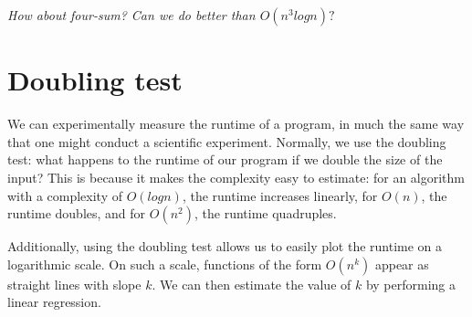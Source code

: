 \documentclass{article}
\begin{document}
\textit{How about four-sum? Can we do better than $O(n^3 log n)?$}


\section{Doubling test}

We can experimentally measure the runtime of a program, in much the same way that one might conduct a scientific experiment. Normally, we use the doubling test: what happens to the runtime of our program if we double the size of the input? This is because it makes the complexity easy to estimate: for an algorithm with a complexity of $O(log n)$, the runtime increases linearly, for $O(n)$, the runtime doubles, and for $O(n^2)$, the runtime quadruples.

Additionally, using the doubling test allows us to easily plot the runtime on a logarithmic scale. On such a scale, functions of the form $O(n^k)$ appear as straight lines with slope $k$. We can then estimate the value of $k$ by performing a linear regression.
\end{document}

